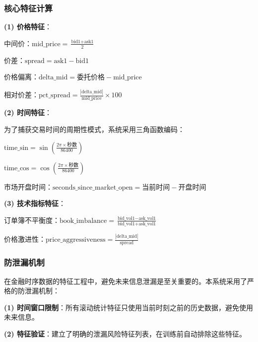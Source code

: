 \documentclass[12pt,a4paper]{article}
\begin{document}
\subsubsection{核心特征计算}

\textbf{(1) 价格特征}：

中间价：$\text{mid\_price} = \frac{\text{bid1} + \text{ask1}}{2}$

价差：$\text{spread} = \text{ask1} - \text{bid1}$

价格偏离：$\text{delta\_mid} = \text{委托价格} - \text{mid\_price}$

相对价差：$\text{pct\_spread} = \frac{|\text{delta\_mid}|}{\text{mid\_price}} \times 100$

\textbf{(2) 时间特征}：

为了捕获交易时间的周期性模式，系统采用三角函数编码：

$\text{time\_sin} = \sin\left(\frac{2\pi \times \text{秒数}}{86400}\right)$

$\text{time\_cos} = \cos\left(\frac{2\pi \times \text{秒数}}{86400}\right)$

市场开盘时间：$\text{seconds\_since\_market\_open} = \text{当前时间} - \text{开盘时间}$

\textbf{(3) 技术指标特征}：

订单簿不平衡度：$\text{book\_imbalance} = \frac{\text{bid\_vol1} - \text{ask\_vol1}}{\text{bid\_vol1} + \text{ask\_vol1}}$

价格激进性：$\text{price\_aggressiveness} = \frac{|\text{delta\_mid}|}{\text{spread}}$

\subsubsection{防泄漏机制}

在金融时序数据的特征工程中，避免未来信息泄漏是至关重要的。本系统采用了严格的防泄漏机制：

\textbf{(1) 时间窗口限制}：所有滚动统计特征只使用当前时刻之前的历史数据，避免使用未来信息。

\textbf{(2) 特征验证}：建立了明确的泄漏风险特征列表，在训练前自动排除这些特征。
\end{document}
